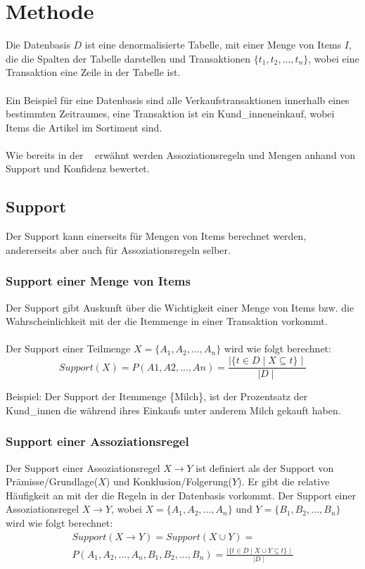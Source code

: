 \chapter{Methode}
Die Datenbasis $D$ ist eine denormalisierte Tabelle, mit einer Menge von Items $I$, die die Spalten der Tabelle darstellen und Transaktionen $\{t_1,t_2,...,t_n\}$, wobei eine Transaktion eine Zeile in der Tabelle ist.
\\
\\
Ein Beispiel für eine Datenbasis sind alle Verkaufstransaktionen innerhalb eines bestimmten Zeitraumes, eine Transaktion ist ein Kund\_inneneinkauf, wobei Items die Artikel im Sortiment sind. 
\parencite[s.][1 Introduction]{IBM}
\\
\\
Wie bereits in der ~ erwähnt werden Assoziationsregeln und Mengen anhand von Support und Konfidenz bewertet.

\section{Support}
Der Support kann einerseits für Mengen von Items berechnet werden, andererseits aber auch für Assoziationsregeln selber.
\subsection{Support einer Menge von Items}
Der Support gibt Auskunft über die Wichtigkeit einer Menge von Items bzw. die Wahrscheinlichkeit mit der die Itemmenge in einer Transaktion vorkommt.
\\
\\
Der Support einer Teilmenge $X=\{A_1, A_2,...,A_n\}$ wird wie folgt berechnet:\\
\begin{equation}
Support(X) = P(A1, A2, ... , An)= \frac{\mid \{t \in D \mid  X \subseteq  t\}\mid}{\mid D \mid}
\end{equation}

Beispiel: 
Der Support der Itemmenge \{Milch\}, ist der Prozentsatz der Kund\_innen die während ihres Einkaufs unter anderem Milch gekauft haben.\parencite[s.][S. 171f]{TU_Dortmund}

\subsection{Support einer Assoziationsregel}
Der Support einer Assoziationsregel $X \rightarrow Y$ ist definiert als der Support von Prämisse/Grundlage($X$) und Konklusion/Folgerung($Y$). Er gibt die relative Häufigkeit an mit der die Regeln in der Datenbasis vorkommt.
Der Support einer Assoziationsregel $X \rightarrow Y$, wobei $X=\{A_1,A_2,...,A_n\}$ und $Y=\{B_1,B_2,...,B_n\}$ wird wie folgt berechnet:\\
\begin{eqnarray}
Support(X \rightarrow Y)= Support(X \cup Y) =  \\
P(A_1, A_2, ... , A_n, B_1, B_2, ..., B_n) = \frac{\mid \{t \in D \mid  X \cup Y \subseteq  t\}\mid}{\mid D \mid}
\end{eqnarray}
\parencite[s.][S. 173]{TU_Dortmund}


